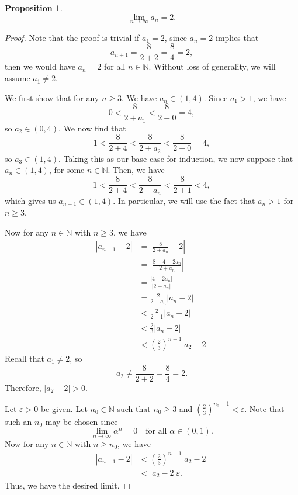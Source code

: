 \documentclass[12pt]{article}
\newtheorem{proposition}{Proposition}
\newcommand{\ds}{\displaystyle}
\let\eps\varepsilon %
\newcommand{\N}{\mathbb{N}} %
\newcommand{\<}{\left\langle} %
\renewcommand{\>}{\right\rangle} %
\begin{document}
\begin{proposition}
    \[\lim_{n\to\infty}a_n = 2.\]
\end{proposition}

\begin{proof}
    Note that the proof is trivial if $a_1=2$, since $a_n=2$ implies that
    \[a_{n+1} = \frac8{2+2} = \frac84 = 2,\]
    then we would have $a_n=2$ for all $n\in\N$. Without loss of generality, we will assume $a_1\ne2$.
    
    We first show that for any $n\geq 3$. We have $a_n\in(1,4)$. Since $a_1>1$, we have
    \[0 < \frac8{2+a_1} < \frac8{2+0} = 4,\]
    so $a_2\in(0,4)$. We now find that
    \[1 < \frac8{2+4} < \frac8{2+a_2} < \frac8{2+0} = 4,\]
    so $a_3\in(1,4)$. Taking this as our base case for induction, we now suppose that $a_n\in(1,4)$, for some $n\in\N$. Then, we have
    \[1 < \frac8{2+4} < \frac8{2+a_n} < \frac8{2+1} < 4,\]
    which gives us $a_{n+1}\in(1,4)$. In particular, we will use the fact that $a_n> 1$ for $n\geq3$.

    Now for any $n\in\N$ with $n\geq 3$, we have
    \begin{align*}
        \left| a_{n+1} - 2\right|
            &= \left|\frac{8}{2+a_n} - 2\right| \\
            &= \left|\frac{8 - 4 - 2a_n}{2+a_n} \right| \\
            &= \frac{|4 - 2a_n|}{|2+a_n|} \\
            &= \frac2{2+a_n}|a_n - 2| \\
            &< \frac2{2+1}|a_n - 2| \\
            &< \frac23|a_n - 2| \\
            &<\left(\frac23\right)^{n-1}|a_2 -2|
    \end{align*}
    Recall that $a_1\ne 2$, so
    \[a_2 \ne \frac8{2+2} = \frac84 = 2.\]
    Therefore, $|a_2-2|>0$.
    
    Let $\eps>0$ be given. Let $n_0\in\N$ such that $n_0\geq 3$ and $\ds\left(\frac23\right)^{n_0-1} < \eps$. Note that such an $n_0$ may be chosen since
    \[\lim_{n\to\infty}\alpha^n = 0 \quad\text{for all $\alpha\in(0,1)$.}\]
    Now for any $n\in\N$ with $n\geq n_0$, we have
    \begin{align*}
        \left| a_{n+1} - 2\right|
            &<\left(\frac23\right)^{n-1}|a_2 -2| \\
            &< |a_2 -2| \eps.
    \end{align*}
    Thus, we have the desired limit.
    
    
\end{proof}
\end{document}
